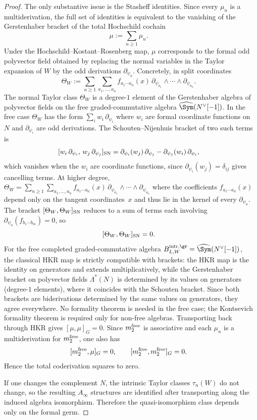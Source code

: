 \begin{proof}
The only substantive issue is the Stasheff identities. Since every $\mu_n$ is a multiderivation, the full set of identities is equivalent to the vanishing of the Gerstenhaber bracket of the total Hochschild cochain
\[
\mu:=\sum_{n\ge 1}\mu_n.
\]
Under the Hochschild--Kostant--Rosenberg map, $\mu$ corresponds to the formal odd polyvector field obtained by replacing the normal variables in the Taylor expansion of $W$ by the odd derivations $\partial_{\psi_a}$. Concretely, in split coordinates
\[
\Theta_W:=\sum_{n\ge 1}
\sum_{a_1,\dots,a_n}
f_{a_1\cdots a_n}(x)\,
\partial_{\psi_{a_1}}\wedge\cdots\wedge \partial_{\psi_{a_n}}.
\]
The normal Taylor class $\Theta_W$ is a degree-$1$ element of the Gerstenhaber algebra of polyvector fields on the free graded-commutative algebra $\widehat{\Sym}(N^\vee[-1])$. In the free case $\Theta_W$ has the form $\sum_i w_i\,\partial_{\psi_i}$ where $w_i$ are formal coordinate functions on $N$ and $\partial_{\psi_i}$ are odd derivations. The Schouten--Nijenhuis bracket of two such terms is
\[
[w_i\,\partial_{\psi_i},\, w_j\,\partial_{\psi_j}]_{\mathrm{SN}}
= \partial_{\psi_i}(w_j)\,\partial_{\psi_j}
- \partial_{\psi_j}(w_i)\,\partial_{\psi_i},
\]
which vanishes when the $w_i$ are coordinate functions, since $\partial_{\psi_i}(w_j)=\delta_{ij}$ gives cancelling terms. At higher degree, $\Theta_W=\sum_{n\ge 1}\sum_{a_1,\ldots,a_n}f_{a_1\cdots a_n}(x)\,\partial_{\psi_{a_1}}\wedge\cdots\wedge\partial_{\psi_{a_n}}$ where the coefficients $f_{a_1\cdots a_n}(x)$ depend only on the tangent coordinates~$x$ and thus lie in the kernel of every $\partial_{\psi_a}$. The bracket $[\Theta_W,\Theta_W]_{\mathrm{SN}}$ reduces to a sum of terms each involving $\partial_{\psi_a}(f_{b_1\cdots b_m})=0$, so
\[
[\Theta_W,\Theta_W]_{\mathrm{SN}}=0.
\]
For the free completed graded-commutative algebra $B^{\intr,\gr}_{L,W}=\widehat{\Sym}(N^\vee[-1])$, the classical HKR map is strictly compatible with brackets: the HKR map is the identity on generators and extends multiplicatively, while the Gerstenhaber bracket on polyvector fields $\Lambda^*(N)$ is determined by its values on generators (degree-$1$ elements), where it coincides with the Schouten bracket. Since both brackets are biderivations determined by the same values on generators, they agree everywhere. No formality theorem is needed in the free case; the Kontsevich formality theorem is required only for non-free algebras. Transporting back through HKR gives $[\mu,\mu]_G=0$. Since $m_2^{\mathrm{free}}$ is associative and each $\mu_n$ is a multiderivation for $m_2^{\mathrm{free}}$, one also has
\[
[m_2^{\mathrm{free}},\mu]_G=0,
\qquad
[m_2^{\mathrm{free}},m_2^{\mathrm{free}}]_G=0.
\]
Hence the total coderivation squares to zero.

If one changes the complement $N$, the intrinsic Taylor classes $\tau_n(W)$ do not change, so the resulting $A_\infty$ structures are identified after transporting along the induced algebra isomorphism. Therefore the quasi-isomorphism class depends only on the formal germ.
\end{proof}

